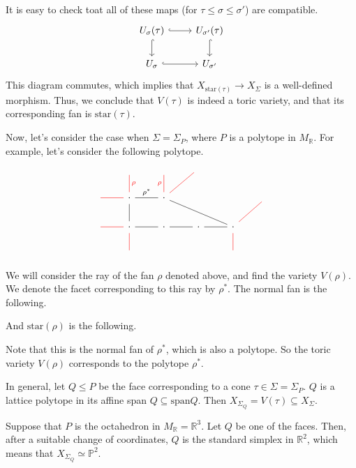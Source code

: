 \documentclass[a4paper,12pt]{amsart}
\newcommand{\RR}{\mathbb{R}}
\newcommand{\PP}{\mathbb{P}}
\begin{document}
It is easy to check toat all of these maps (for $\tau\leq\sigma\leq\sigma'$) are compatible.
$$\begin{tikzcd}
U_\sigma(\tau) \arrow[hookrightarrow]{r} \arrow[hookrightarrow]{d} & U_{\sigma'}(\tau) \arrow[hookrightarrow]{d}\\
U_\sigma \arrow[hookrightarrow]{r} & U_{\sigma'}
\end{tikzcd}$$
This diagram commutes, which implies that $X_{\text{star}(\tau)}\rightarrow X_\Sigma$ is a well-defined morphism. Thus, we conclude that $V(\tau)$ is indeed a toric variety, and that its corresponding fan is $\text{star}(\tau)$.

Now, let's consider the case when $\Sigma=\Sigma_P$, where $P$ is a polytope in $M_\RR$. For example, let's consider the following polytope.

$$ \begin{tikzcd}
\text{}& \text{} \arrow[d,red,dash,"\rho"]&\text{} & \text{} &      \\
\arrow[r,red,dash] &\cdot \arrow[r,dash,"\rho^*"] \arrow[d,dash] & \cdot \arrow[rrd, dash] \arrow[ur,red,dash]  \arrow[u,red,dash,"\rho"] & & &\text{}   \\
\arrow[r,red,dash]&\cdot \arrow[r,dash] \arrow[d,red,dash] &	\cdot &\cdot \arrow[l,dash]   &\cdot  \arrow[l,dash] \arrow[d,red,dash]\arrow[ru,red,dash] &   \\
&\text{} & & &	\text{}
\end{tikzcd}$$

We will consider the ray of the fan $\rho$ denoted above, and find the variety $V(\rho)$. We denote the facet corresponding to this ray by $\rho^*$. The normal fan is the following.

And $\text{star}(\rho)$ is the following.

Note that this is the normal fan of $\rho^*$, which is also a polytope. So the toric variety $V(\rho)$ corresponds to the polytope $\rho^*$.

In general, let $Q\leq P$ be the face corresponding to a cone $\tau\in\Sigma=\Sigma_P$. $Q$ is a lattice polytope in its affine span $Q\subseteq\text{span} Q$. Then $X_{\Sigma_Q}=V(\tau)\subseteq X_\Sigma$.

\begin{example}
	Suppose that $P$ is the octahedron in $M_\RR=\RR^3$. Let $Q$ be one of the faces. Then, after a suitable change of coordinates, $Q$ is the standard simplex in $\RR^2$, which means that $X_{\Sigma_Q}\simeq\PP^2$.
\end{example}
\end{document}
